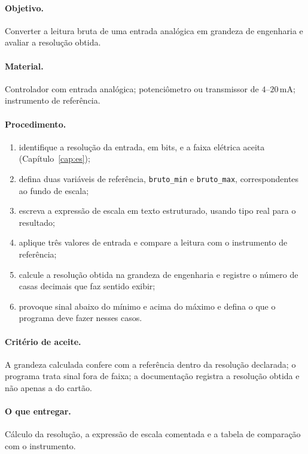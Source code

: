 \paragraph{Objetivo.} Converter a leitura bruta de uma entrada analógica em grandeza de engenharia e
avaliar a resolução obtida.

\paragraph{Material.} Controlador com entrada analógica; potenciômetro ou transmissor de
$4$--$20\,$mA; instrumento de referência.

\paragraph{Procedimento.}
\begin{enumerate}
  \item identifique a resolução da entrada, em bits, e a faixa elétrica aceita
        (Capítulo~\ref{cap:es});
  \item defina duas variáveis de referência, \texttt{bruto\_min} e \texttt{bruto\_max}, correspondentes
        ao fundo de escala;
  \item escreva a expressão de escala em texto estruturado, usando tipo real para o resultado;
  \item aplique três valores de entrada e compare a leitura com o instrumento de referência;
  \item calcule a resolução obtida na grandeza de engenharia e registre o número de casas decimais que
        faz sentido exibir;
  \item provoque sinal abaixo do mínimo e acima do máximo e defina o que o programa deve fazer nesses
        casos.
\end{enumerate}

\paragraph{Critério de aceite.} A grandeza calculada confere com a referência dentro da resolução
declarada; o programa trata sinal fora de faixa; a documentação registra a resolução obtida e não
apenas a do cartão.

\paragraph{O que entregar.} Cálculo da resolução, a expressão de escala comentada e a tabela de
comparação com o instrumento.

